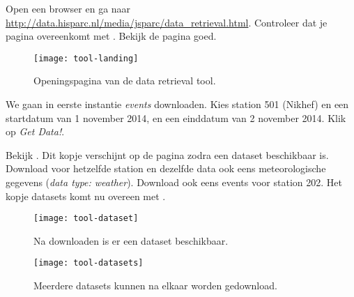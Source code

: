 \begin{questions}
\begin{savenotes}
\end{savenotes}

\question Open een browser en ga naar
\url{http://data.hisparc.nl/media/jsparc/data_retrieval.html}.  Controleer
dat je pagina overeenkomt met .  Bekijk de pagina
goed.

\begin{figure}
  \centering
  \texttt{[image: tool-landing]}
  \caption{Openingspagina van de data retrieval tool.}
  \label{fig:tool-landing}
\end{figure}


\question We gaan in eerste instantie \emph{events} downloaden.  Kies
station 501 (Nikhef) en een startdatum van 1 november 2014, en een
einddatum van 2 november 2014. Klik op \emph{Get Data!}.


\question Bekijk . Dit kopje verschijnt op de
pagina zodra een dataset beschikbaar is. Download voor hetzelfde station
en dezelfde data ook eens meteorologische gegevens (\emph{data type:
weather}).  Download ook eens events voor station 202. Het kopje datasets
komt nu overeen met .

\begin{figure}
  \centering
  \texttt{[image: tool-dataset]}
  \caption{Na downloaden is er een dataset beschikbaar.}
  \label{fig:tool-dataset}
\end{figure}

\begin{figure}
  \centering
  \texttt{[image: tool-datasets]}
  \caption{Meerdere datasets kunnen na elkaar worden gedownload.}
  \label{fig:tool-datasets}
\end{figure}


\end{questions}
